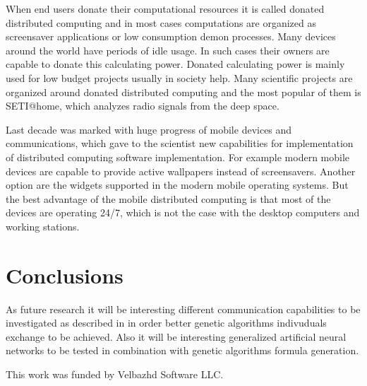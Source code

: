 \documentclass[graybox]{svmult}
\begin{document}
When end users donate their computational resources it is called donated distributed computing and in most cases computations are organized as screensaver applications or low consumption demon processes. Many devices around the world have periods of idle usage. In such cases their owners are capable to donate this calculating power. Donated calculating power is mainly used for low budget projects usually in society help. Many scientific projects are organized around donated distributed computing and the most popular of them is SETI@home, which analyzes radio signals from the deep space. 

Last decade was marked with huge progress of mobile devices and communications, which gave to the scientist new capabilities for implementation of distributed computing software implementation. For example modern mobile devices are capable to provide active wallpapers instead of screensavers. Another option are the widgets supported in the modern mobile operating systems. But the best advantage of the mobile distributed computing is that most of the devices are operating 24/7, which is not the case with the desktop computers and working stations. 

\section{Conclusions} \label{Conclusions}

As future research it will be interesting different communication capabilities to be investigated as described in \cite{alexandrov01} in order better genetic algorithms indivuduals exchange to be achieved. Also it will be interesting generalized artificial neural networks \cite{tashev01} to be tested in combination with genetic algorithms formula generation.

\begin{acknowledgement}
This work was funded by Velbazhd Software LLC.
\end{acknowledgement}
\end{document}
